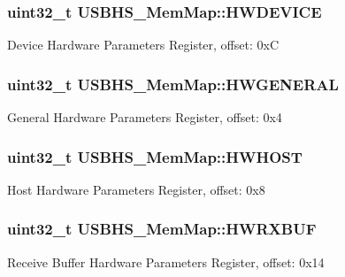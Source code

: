 \subsubsection[{H\+W\+D\+E\+V\+I\+C\+E}]{\setlength{\rightskip}{0pt plus 5cm}uint32\+\_\+t U\+S\+B\+H\+S\+\_\+\+Mem\+Map\+::\+H\+W\+D\+E\+V\+I\+C\+E}\label{struct_u_s_b_h_s___mem_map_a107edcad73cd5c798c766e09940f3d7d}
Device Hardware Parameters Register, offset\+: 0x\+C \hypertarget{struct_u_s_b_h_s___mem_map_abf62294144221450dac968fe1598f745}{}
\subsubsection[{H\+W\+G\+E\+N\+E\+R\+A\+L}]{\setlength{\rightskip}{0pt plus 5cm}uint32\+\_\+t U\+S\+B\+H\+S\+\_\+\+Mem\+Map\+::\+H\+W\+G\+E\+N\+E\+R\+A\+L}\label{struct_u_s_b_h_s___mem_map_abf62294144221450dac968fe1598f745}
General Hardware Parameters Register, offset\+: 0x4 \hypertarget{struct_u_s_b_h_s___mem_map_a23b580e1655533bb112fd6e4d2a60e71}{}
\subsubsection[{H\+W\+H\+O\+S\+T}]{\setlength{\rightskip}{0pt plus 5cm}uint32\+\_\+t U\+S\+B\+H\+S\+\_\+\+Mem\+Map\+::\+H\+W\+H\+O\+S\+T}\label{struct_u_s_b_h_s___mem_map_a23b580e1655533bb112fd6e4d2a60e71}
Host Hardware Parameters Register, offset\+: 0x8 \hypertarget{struct_u_s_b_h_s___mem_map_a6d3e0350ab617222d58e51b9748a25df}{}
\subsubsection[{H\+W\+R\+X\+B\+U\+F}]{\setlength{\rightskip}{0pt plus 5cm}uint32\+\_\+t U\+S\+B\+H\+S\+\_\+\+Mem\+Map\+::\+H\+W\+R\+X\+B\+U\+F}\label{struct_u_s_b_h_s___mem_map_a6d3e0350ab617222d58e51b9748a25df}
Receive Buffer Hardware Parameters Register, offset\+: 0x14 \hypertarget{struct_u_s_b_h_s___mem_map_a2ea6ab8550283d6c27c79416fd767954}{}
